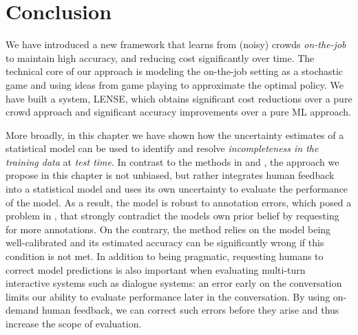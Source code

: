 \section{Conclusion}
\label{sec:otj:conclusion}

We have introduced a new framework that learns from (noisy) crowds \emph{on-the-job}
to maintain high accuracy, and reducing cost significantly over time.
The technical core of our approach is modeling the on-the-job setting
as a stochastic game and using ideas from game playing to approximate the optimal policy.
We have built a system, LENSE, %
which obtains significant cost reductions over a pure crowd approach
and significant accuracy improvements over a pure ML approach.

More broadly, in this chapter we have shown how the uncertainty estimates of a statistical model can be used to identify and resolve \textit{incompleteness in the training data} at \textit{test time}.
In contrast to the methods in  and , the approach we propose in this chapter is not unbiased, but rather integrates human feedback into a statistical model and uses its own uncertainty to evaluate the performance of the model.
As a result, the model is robust to annotation errors, which posed a problem in , that strongly contradict the models own prior belief by requesting for more annotations.
On the contrary, the method relies on the model being well-calibrated and its estimated accuracy can be significantly wrong if this condition is not met.
In addition to being pragmatic, requesting humans to correct model predictions is also important when evaluating multi-turn interactive systems such as dialogue systems:
  an error early on the conversation limits our ability to evaluate performance later in the conversation. 
By using on-demand human feedback, we can correct such errors before they arise and thus increase the scope of evaluation.
